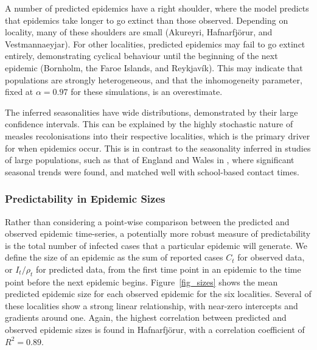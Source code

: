 \documentclass[10pt]{article}
\begin{document}
A number of predicted epidemics have a right shoulder, where the model predicts that epidemics take longer to go extinct than those observed. Depending on locality, many of these shoulders are small (Akureyri, Hafnarfj\"{o}r\dh{}ur, and Vestmannaeyjar). For other localities, predicted epidemics may fail to go extinct entirely, demonstrating cyclical behaviour until the beginning of the next epidemic (Bornholm, the Faroe Islands, and Reykjav\'{i}k). This may indicate that populations are strongly heterogeneous, and that the inhomogeneity parameter, fixed at $\alpha=0.97$ for these simulations, is an overestimate.


The inferred seasonalities have wide distributions, demonstrated by their large confidence intervals. This can be explained by the highly stochastic nature of measles recolonisations into their respective localities, which is the primary driver for when epidemics occur. This is in contrast to the seasonality inferred in studies of large populations, such as that of England and Wales in \cite{Finkenstadt2000}, where significant seasonal trends were found, and matched well with school-based contact times.






\subsubsection*{Predictability in Epidemic Sizes}

Rather than considering a point-wise comparison between the predicted and observed epidemic time-series, a potentially more robust measure of predictability is the total number of infected cases that a particular epidemic will generate. We define the size of an epidemic as the sum of reported cases $C_t$ for observed data, or $I_t / \rho_t$ for predicted data, from the first time point in an epidemic to the time point before the next epidemic begins. Figure~\ref{fig_sizes} shows the mean predicted epidemic size for each observed epidemic for the six localities. Several of these localities show a strong linear relationship, with near-zero intercepts and gradients around one. Again, the highest correlation between predicted and observed epidemic sizes is found in Hafnarfj\"{o}r\dh{}ur, with a correlation coefficient of $R^2 = 0.89$.
\end{document}
